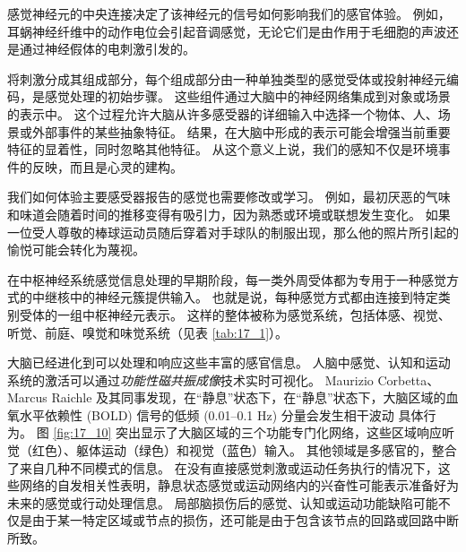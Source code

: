 感觉神经元的中央连接决定了该神经元的信号如何影响我们的感官体验。 
例如，耳蜗神经纤维中的动作电位会引起音调感觉，无论它们是由作用于毛细胞的声波还是通过神经假体的电刺激引发的。


将刺激分成其组成部分，每个组成部分由一种单独类型的感觉受体或投射神经元编码，是感觉处理的初始步骤。 
这些组件通过大脑中的神经网络集成到对象或场景的表示中。 
这个过程允许大脑从许多感受器的详细输入中选择一个物体、人、场景或外部事件的某些抽象特征。 
结果，在大脑中形成的表示可能会增强当前重要特征的显着性，同时忽略其他特征。 
从这个意义上说，我们的感知不仅是环境事件的反映，而且是心灵的建构。


我们如何体验主要感受器报告的感觉也需要修改或学习。 
例如，最初厌恶的气味和味道会随着时间的推移变得有吸引力，因为熟悉或环境或联想发生变化。 
如果一位受人尊敬的棒球运动员随后穿着对手球队的制服出现，那么他的照片所引起的愉悦可能会转化为蔑视。


在中枢神经系统感觉信息处理的早期阶段，每一类外周受体都为专用于一种感觉方式的中继核中的神经元簇提供输入。 
也就是说，每种感觉方式都由连接到特定类别受体的一组中枢神经元表示。 
这样的整体被称为感觉系统，包括体感、视觉、听觉、前庭、嗅觉和味觉系统（见表 \ref{tab:17_1}）。


大脑已经进化到可以处理和响应这些丰富的感官信息。 
人脑中感觉、认知和运动系统的激活可以通过\textit{功能性磁共振成像}技术实时可视化。 
Maurizio Corbetta、Marcus Raichle 及其同事发现，在“静息”状态下，在“静息”状态下，大脑区域的血氧水平依赖性 (BOLD) 信号的低频 (0.01–0.1 Hz) 分量会发生相干波动 具体行为。 
图 \ref{fig:17_10} 突出显示了大脑区域的三个功能专门化网络，这些区域响应听觉（红色）、躯体运动（绿色）和视觉（蓝色）输入。 
其他领域是多感官的，整合了来自几种不同模式的信息。 
在没有直接感觉刺激或运动任务执行的情况下，这些网络的自发相关性表明，静息状态感觉或运动网络内的兴奋性可能表示准备好为未来的感觉或行动处理信息。 
局部脑损伤后的感觉、认知或运动功能缺陷可能不仅是由于某一特定区域或节点的损伤，还可能是由于包含该节点的回路或回路中断所致。



